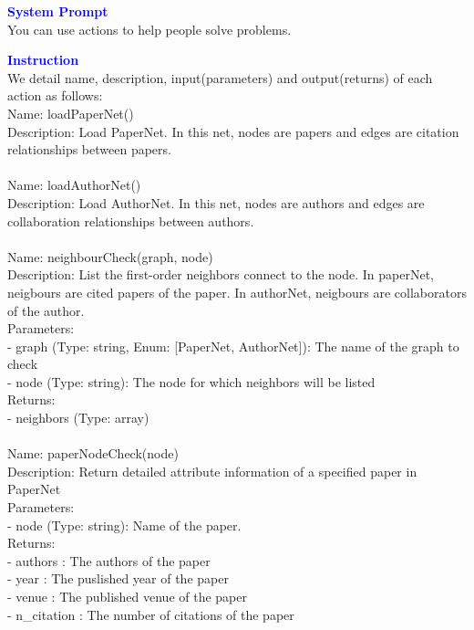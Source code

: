 \begin{tcolorbox}[breakable,title=Prompt Details for Academia]
\textbf{\textcolor{blue}{System Prompt}}\\ 
You can use actions to help people solve problems.\\
\textbf{\textcolor{blue}{Instruction}}\\
We detail name, description, input(parameters) and output(returns) of each action as follows:\\
Name: loadPaperNet()\\
Description: Load PaperNet. In this net, nodes are papers and edges are citation relationships between papers.\\
\\
Name: loadAuthorNet()\\
Description: Load AuthorNet. In this net, nodes are authors and edges are collaboration relationships between authors.\\
\\
Name: neighbourCheck(graph, node)\\
Description: List the first-order neighbors connect to the node. In paperNet, neigbours are cited papers of the paper. In authorNet, neigbours are collaborators of the author.\\
Parameters:\\
- graph (Type: string, Enum: [PaperNet, AuthorNet]): The name of the graph to check\\
- node (Type: string): The node for which neighbors will be listed\\
Returns:\\
- neighbors (Type: array)\\
\\
Name: paperNodeCheck(node)\\
Description: Return detailed attribute information of a specified paper in PaperNet\\
Parameters:\\
- node (Type: string): Name of the paper.\\
Returns:\\
- authors : The authors of the paper\\
- year : The puslished year of the paper\\
- venue : The published venue of the paper\\
- n\_citation : The number of citations of the paper\\

\end{tcolorbox}
